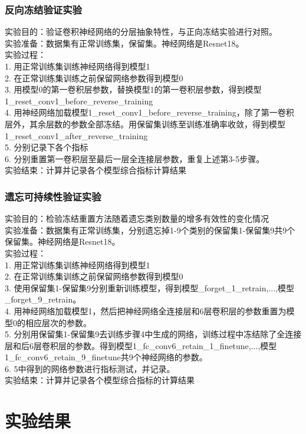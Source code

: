 \subsubsection{反向冻结验证实验}
实验目的：验证卷积神经网络的分层抽象特性，与正向冻结实验进行对照。
\\实验准备：数据集有正常训练集，保留集。神经网络是Resnet18。
\\实验过程：
\\1. 用正常训练集训练神经网络得到模型1
\\2. 在正常训练集训练之前保留网络参数得到模型0
\\3. 用模型0的第一卷积层参数，替换模型1的第一卷积层参数，得到模型1\_reset\_conv1\_before\_reverse\_training
\\4. 用神经网络加载模型1\_reset\_conv1\_before\_reverse\_training，除了第一卷积层外，其余层数的参数全部冻结。用保留集训练至训练准确率收敛，得到模型1\_reset\_conv1\_after\_reverse\_training
\\5. 分别记录下各个指标
\\6. 分别重置第一卷积层至最后一层全连接层参数，重复上述第3-5步骤。
\\实验结束：计算并记录各个模型综合指标计算结果
\subsubsection{遗忘可持续性验证实验}
实验目的：检验冻结重置方法随着遗忘类别数量的增多有效性的变化情况
\\实验准备：数据集有正常训练集，分别遗忘掉1-9个类别的保留集1-保留集9共9个保留集。神经网络是Resnet18。
\\实验过程：
\\1. 用正常训练集训练神经网络得到模型1
\\2. 在正常训练集训练之前保留网络参数得到模型0
\\3. 使用保留集1-保留集9分别重新训练模型，得到模型\_forget\_1\_retrain,...,模型\_forget\_9\_retrain。
\\4. 用神经网络加载模型1，然后把神经网络全连接层和6层卷积层的参数重置为模型0的相应层次的参数。
\\5. 分别用保留集1-保留集9去训练步骤4中生成的网络，训练过程中冻结除了全连接层和后6层卷积层的参数。得到模型1\_fc\_conv6\_retain\_1\_finetune,...,模型1\_fc\_conv6\_retain\_9\_finetune共9个神经网络的参数。
\\6. 5中得到的网络参数进行指标测试，并记录。
\\实验结束：计算并记录各个模型综合指标的计算结果
\section{实验结果}
